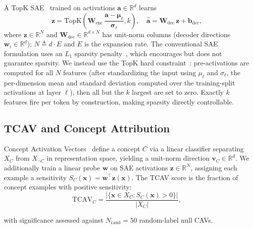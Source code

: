 \documentclass{article}
\begin{document}
A TopK SAE~\cite{makhzani2014ksparse} trained on activations $\mathbf{a} \in \mathbb{R}^d$ learns
\begin{equation}
\mathbf{z} = \mathrm{TopK}\left(\mathbf{W}_{\text{enc}}\,\frac{\mathbf{a} - \boldsymbol{\mu_\ell}}{\boldsymbol{\sigma_\ell}}, k\right),
\quad
\hat{\mathbf{a}} = \mathbf{W}_{\text{dec}}\,\mathbf{z} + \mathbf{b}_{\text{dec}},
\label{eq:sae}
\end{equation}
where $\mathbf{z} \in \mathbb{R}^N$ and $\mathbf{W}_{\text{dec}} \in \mathbb{R}^{d \times N}$ has unit-norm columns (decoder directions $\mathbf{w}_i \in \mathbb{R}^d$); $N \triangleq d \cdot E$ and $E$ is the expansion rate. The conventional SAE formulation uses an $L_1$ sparsity penalty~\cite{cunningham2023sparse}, which encourages but does not guarantee sparsity. We instead use the TopK hard constraint~\cite{templeton2024scaling}: pre-activations are computed for all $N$ features (after standardizing the input using $\mu_\ell$ and $\sigma_\ell$, the per-dimension mean and standard deviation computed over the training-split activations at layer $\ell$), then all but the $k$ largest are set to zero. Exactly $k$ features fire per token by construction, making sparsity directly controllable.

\subsection{TCAV and Concept Attribution}
\label{sec:background_tcav}

Concept Activation Vectors~\cite{kim2018tcav} define a concept $C$ via a
linear classifier separating $X_C$ from $X_{\neg C}$ in representation
space, yielding a unit-norm direction $\mathbf{v}_C \in \mathbb{R}^d$.
We additionally train a linear probe $\mathbf{w}$ on SAE activations
$\mathbf{z} \in \mathbb{R}^{N}$, assigning each example a sensitivity
$S_C(\mathbf{x}) = \mathbf{w}^\top \mathbf{z}(\mathbf{x})$.
The TCAV score is the fraction of concept examples with positive
sensitivity:
\begin{equation}
    \mathrm{TCAV}_C =
    \frac{|\{\mathbf{x} \in X_C : S_C(\mathbf{x}) > 0\}|}{|X_C|},
\label{eq:tcav}
\end{equation}

with significance assessed against $N_{\mathrm{rand}}=50$ random-label
null CAVs.

\end{document}
